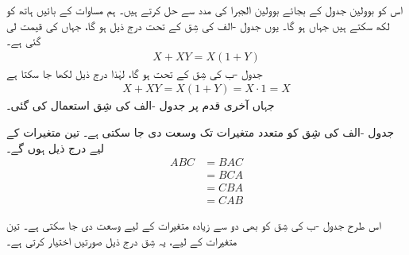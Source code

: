\quad
اس کو بوولین جدول کے بجائے بوولین الجبرا کی مدد سے حل کرتے ہیں۔ ہم مساوات کے بائیں ہاتھ کو  لکھ سکتے ہیں جہاں  ہو گا۔ یوں جدول -الف کی شِق  کے تحت درج ذیل ہو گا، جہاں  کی قیمت  لی گئی ہے۔
\begin{align*}
X+XY=X(1+Y)
\end{align*}
جدول -ب کی شِق  کے تحت  ہو گا، لہٰذا درج ذیل لکھا جا سکتا ہے
\begin{align*}
X+XY=X(1+Y)=X\cdot 1=X
\end{align*}
جہاں آخری قدم پر جدول -الف کی شِق  استعمال کی گئی۔



جدول -الف کی شِق  کو متعدد متغیرات تک وسعت دی جا سکتی ہے۔ تین متغیرات کے لیے درج ذیل ہوں گے۔
\begin{align*}
ABC&=BAC\\
&=BCA\\
&=CBA\\
&=CAB
\end{align*}
 
اس طرح جدول -ب کی شِق  کو بھی دو سے زیادہ متغیرات کے لیے وسعت دی جا سکتی ہے۔ تین متغیرات کے لیے، یہ شِق درج ذیل صورتیں اختیار کرتی ہے۔

